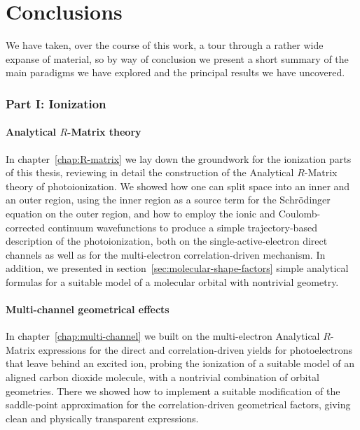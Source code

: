 





\chapter{Conclusions}
\label{chap:conclusions}
We have taken, over the course of this work, a tour through a rather wide expanse of material, so by way of conclusion we present a short summary of the main paradigms we have explored and the principal results we have uncovered.



\subsection*{Part I: Ionization}

\subsubsection[Analytical R-matrix Theory]{Analytical $R$-Matrix theory}
In chapter~\ref{chap:R-matrix} we lay down the groundwork for the ionization parts of this thesis, reviewing in detail the construction of the Analytical $R$-Matrix theory of photoionization. We showed how one can split space into an inner and an outer region, using the inner region as a source term for the Schrödinger equation on the outer region, and how to employ the ionic and Coulomb-corrected continuum wavefunctions to produce a simple trajectory-based description of the photoionization, both on the single-active-electron direct channels as well as for the multi-electron correlation-driven mechanism. In addition, we presented in section~\ref{sec:molecular-shape-factors} simple analytical formulas for a suitable model of a molecular orbital with nontrivial geometry.




\subsubsection{Multi-channel geometrical effects}
In chapter~\ref{chap:multi-channel} we built on the multi-electron Analytical $R$-Matrix expressions for the direct and correlation-driven yields for photoelectrons that leave behind an excited ion, probing the ionization of a suitable model of an aligned carbon dioxide molecule, with a nontrivial combination of orbital geometries. There we showed how to implement a suitable modification of the saddle-point approximation for the correlation-driven geometrical factors, giving clean and physically transparent expressions. 

